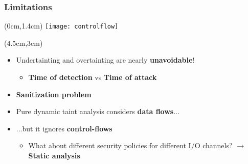 \begin{frame}
	\frametitle{Limitations}
	\begin{textblock*}{5cm}(0cm,1.4cm)
		\texttt{[image: controlflow]}
	\end{textblock*}
	
	\begin{textblock*}{8cm}(4.5cm,3cm)
		\begin{itemize}
			\item Undertainting and overtainting are nearly \textbf{unavoidable}!
			\begin{itemize}
				\item \textbf{Time of detection} vs \textbf{Time of attack}
			\end{itemize}
			\item \textbf{Sanitization problem} \\
					\only<2>{
						\begin{center}
							{\color[rgb]{1,1,1} \texttt{b := a $\oplus$ a}}
						\end{center}
					}
			\item Pure dynamic taint analysis considers \textbf{data flows}...
			\item<3-> ...but it ignores \textbf{control-flows}	
			\begin{itemize}
				\item<3-> What about different security policies for different I/O channels?
					\newline $\rightarrow$ \textbf{Static analysis}
			\end{itemize}
		\end{itemize}
	\end{textblock*}
\end{frame}